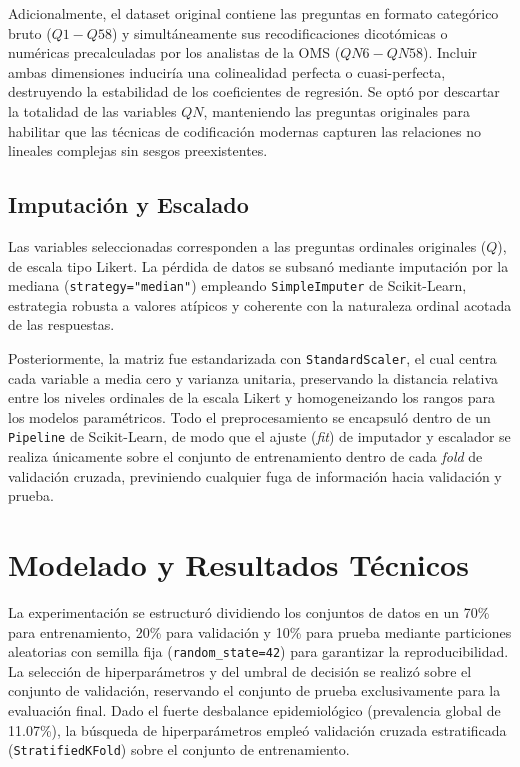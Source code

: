 \documentclass[10pt,journal,compsoc]{IEEEtran}
\begin{document}
Adicionalmente, el dataset original contiene las preguntas en formato categórico bruto ($Q1-Q58$) y simultáneamente sus recodificaciones dicotómicas o numéricas precalculadas por los analistas de la OMS ($QN6-QN58$). Incluir ambas dimensiones induciría una colinealidad perfecta o cuasi-perfecta, destruyendo la estabilidad de los coeficientes de regresión. Se optó por descartar la totalidad de las variables $QN$, manteniendo las preguntas originales para habilitar que las técnicas de codificación modernas capturen las relaciones no lineales complejas sin sesgos preexistentes.

\subsection{Imputación y Escalado}
Las variables seleccionadas corresponden a las preguntas ordinales originales ($Q$), de escala tipo Likert. La pérdida de datos se subsanó mediante imputación por la mediana (\texttt{strategy="median"}) empleando \texttt{SimpleImputer} de Scikit-Learn, estrategia robusta a valores atípicos y coherente con la naturaleza ordinal acotada de las respuestas.

Posteriormente, la matriz fue estandarizada con \texttt{StandardScaler}, el cual centra cada variable a media cero y varianza unitaria, preservando la distancia relativa entre los niveles ordinales de la escala Likert y homogeneizando los rangos para los modelos paramétricos. Todo el preprocesamiento se encapsuló dentro de un \texttt{Pipeline} de Scikit-Learn, de modo que el ajuste (\textit{fit}) de imputador y escalador se realiza únicamente sobre el conjunto de entrenamiento dentro de cada \textit{fold} de validación cruzada, previniendo cualquier fuga de información hacia validación y prueba.

\section{Modelado y Resultados Técnicos}
La experimentación se estructuró dividiendo los conjuntos de datos en un 70\% para entrenamiento, 20\% para validación y 10\% para prueba mediante particiones aleatorias con semilla fija (\texttt{random\_state=42}) para garantizar la reproducibilidad. La selección de hiperparámetros y del umbral de decisión se realizó sobre el conjunto de validación, reservando el conjunto de prueba exclusivamente para la evaluación final. Dado el fuerte desbalance epidemiológico (prevalencia global de 11.07\%), la búsqueda de hiperparámetros empleó validación cruzada estratificada (\texttt{StratifiedKFold}) sobre el conjunto de entrenamiento.
\end{document}
